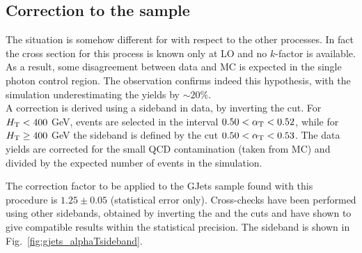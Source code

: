 \subsection{Correction to the \gj sample}
\label{sec:sideband_corrections_gjets}
The situation is somehow different for \gj with respect to the other processes. 
In fact the cross section for this process is known only at LO and no $k$-factor is available. 
As a result, some disagreement between data and MC is expected in the single photon control region.
The observation confirms indeed this hypothesis, with the simulation underestimating the yields by $\sim 20\%$. \\
A correction is derived using a sideband in data, by inverting the \alphat cut. 
For $\scalht < 400$ GeV, events are selected in the interval $0.50 < \alphat < 0.52$, 
while for $\scalht \geq 400$ GeV the sideband is defined by the cut $0.50 < \alphat < 0.53$.
The data yields are corrected for the small QCD contamination (taken from MC) and divided by the expected number of events in the simulation. 

The correction factor to be applied to the GJets sample found with this procedure is $1.25 \pm 0.05$ (statistical error only). 
Cross-checks have been performed using other sidebands, obtained by inverting the \scalht and the \mhtmet cuts 
and have shown to give compatible results within the statistical precision. 
The sideband is shown in Fig.~\ref{fig:gjets_alphaTsideband}. 

